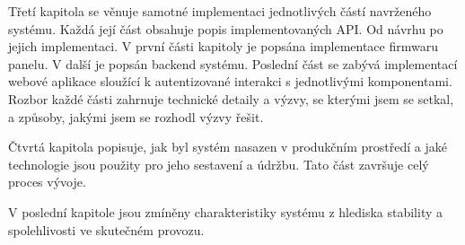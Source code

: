 Třetí kapitola se věnuje samotné implementaci jednotlivých částí navrženého systému. Každá její část obsahuje popis implementovaných API. Od návrhu po jejich implementaci. V první části kapitoly je popsána implementace firmwaru panelu. V další je popsán backend systému. Poslední část se zabývá implementací webové aplikace sloužící k autentizované interakci s jednotlivými komponentami. Rozbor každé části zahrnuje technické detaily a výzvy, se kterými jsem se setkal, a způsoby, jakými jsem se rozhodl výzvy řešit.

Čtvrtá kapitola popisuje, jak byl systém nasazen v produkčním prostředí a jaké technologie jsou použity pro jeho sestavení a údržbu. Tato část završuje celý proces vývoje.

V poslední kapitole jsou zmíněny charakteristiky systému z hlediska stability a spolehlivosti ve skutečném provozu.